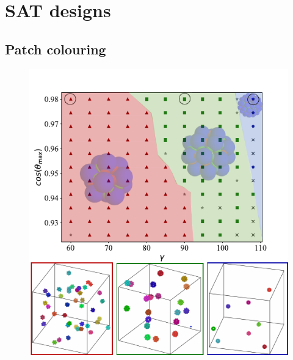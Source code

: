 \documentclass[a4paper, amsfonts, amssymb, amsmath, reprint, showkeys, nofootinbib, oneside]{revtex4-1}
\begin{document}

\section{SAT designs}

\subsection{Patch colouring}


\begin{figure}[t]
	\includegraphics{fig3.pdf}

\end{figure}
\end{document}
